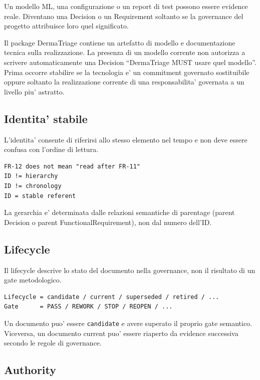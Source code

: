 \documentclass[11pt,a4paper]{article}
\begin{document}
Un modello ML, una configurazione o un report di test possono essere evidence reale. Diventano una Decision o un Requirement soltanto se la governance del progetto attribuisce loro quel significato.

\begin{ddtaexample}[title={DermaTriage - realization fact vs commitment}]
Il package DermaTriage contiene un artefatto di modello e documentazione tecnica sulla realizzazione. La presenza di un modello corrente non autorizza a scrivere automaticamente una Decision ``DermaTriage MUST usare quel modello''. Prima occorre stabilire se la tecnologia e' un commitment governato sostituibile oppure soltanto la realizzazione corrente di una responsabilita' governata a un livello piu' astratto.
\end{ddtaexample}

\subsection{Identita' stabile}

L'identita' consente di riferirsi allo stesso elemento nel tempo e non deve essere confusa con l'ordine di lettura.

\begin{lstlisting}
FR-12 does not mean "read after FR-11"
ID != hierarchy
ID != chronology
ID = stable referent
\end{lstlisting}

La gerarchia e' determinata dalle relazioni semantiche di parentage (parent Decision o parent FunctionalRequirement), non dal numero dell'ID.

\subsection{Lifecycle}

Il lifecycle descrive lo stato del documento nella governance, non il risultato di un gate metodologico.

\begin{lstlisting}
Lifecycle = candidate / current / superseded / retired / ...
Gate      = PASS / REWORK / STOP / REOPEN / ...
\end{lstlisting}

Un documento puo' essere \texttt{candidate} e avere superato il proprio gate semantico. Viceversa, un documento current puo' essere riaperto da evidence successiva secondo le regole di governance.

\subsection{Authority}
\end{document}

